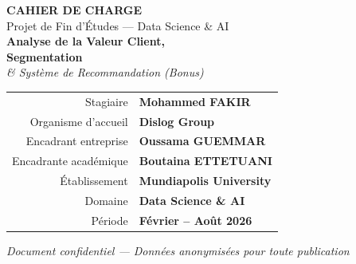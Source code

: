 \documentclass[11pt,a4paper]{article}
\begin{document}
\begin{titlepage}

\vspace*{1.5cm}
\begin{center}
  {\fontsize{13}{15}\selectfont\color{white}\bfseries CAHIER DE CHARGE}\\[4pt]
  {\fontsize{11}{13}\selectfont\color{white!80}Projet de Fin d'Études --- Data Science \& AI}\\[2.5cm]

  {\fontsize{22}{28}\selectfont\color{white}\bfseries Analyse de la Valeur Client,}\\[6pt]
  {\fontsize{22}{28}\selectfont\color{white}\bfseries Segmentation}\\[6pt]
  {\fontsize{16}{20}\selectfont\color{white!90}\itshape \& Système de Recommandation (Bonus)}\\[4cm]

  \begin{tabular}{r@{\hskip 14pt}l}
    {\color{graytext}\small Stagiaire}               & {\color{darktext}\bfseries Mohammed FAKIR} \\[5pt]
    {\color{graytext}\small Organisme d'accueil}      & {\color{darktext}\bfseries Dislog Group} \\[5pt]
    {\color{graytext}\small Encadrant entreprise}     & {\color{darktext}\bfseries Oussama GUEMMAR} \\[5pt]
    {\color{graytext}\small Encadrante académique}    & {\color{darktext}\bfseries Boutaina ETTETUANI} \\[5pt]
    {\color{graytext}\small Établissement}            & {\color{darktext}\bfseries Mundiapolis University} \\[5pt]
    {\color{graytext}\small Domaine}                  & {\color{darktext}\bfseries Data Science \& AI} \\[5pt]
    {\color{graytext}\small Période}                  & {\color{darktext}\bfseries Février -- Août 2026} \\
  \end{tabular}

  \vfill
  {\color{graytext}\small\itshape Document confidentiel --- Données anonymisées pour toute publication}
\end{center}
\restoregeometry
\end{titlepage}
\end{document}
